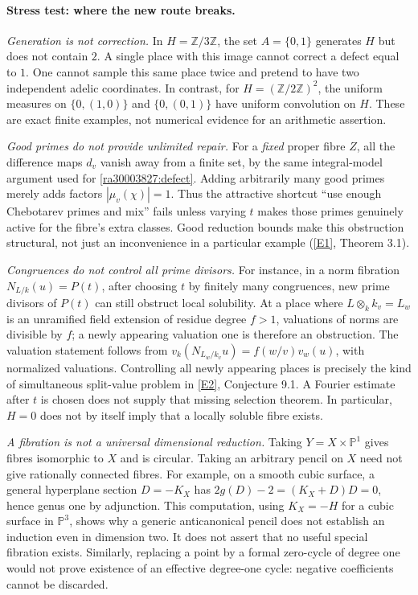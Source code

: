 \documentclass[11pt]{article}
\newcommand{\Z}{\mathbb{Z}}
\newcommand{\PP}{\mathbb P}
\newcommand{\eref}[2]{\hyperlink{extra:#1:#2}{[E#2]}}
\begin{document}
\paragraph{Stress test: where the new route breaks.}
\emph{Generation is not correction.}  In $H=\Z/3\Z$, the set $A=\{0,1\}$
generates $H$ but does not contain $2$.  A single place with this image cannot
correct a defect equal to $1$.  One cannot sample this same place twice and
pretend to have two independent adelic coordinates.  In contrast, for
$H=(\Z/2\Z)^2$, the uniform measures on $\{0,(1,0)\}$ and $\{0,(0,1)\}$
have uniform convolution on $H$.  These are exact finite examples, not
numerical evidence for an arithmetic assertion.

\emph{Good primes do not provide unlimited repair.}  For a \emph{fixed}
proper fibre $Z$, all the difference maps $d_v$ vanish away from a finite set,
by the same integral-model argument used for \eqref{ra30003827:defect}.  Adding
arbitrarily many good primes merely adds factors
$|\widehat\mu_v(\chi)|=1$.  Thus the attractive shortcut ``use enough
Chebotarev primes and mix'' fails unless varying $t$ makes those primes genuinely
active for the fibre's extra classes.  Good reduction bounds make this
obstruction structural, not just an inconvenience in a particular example
(\eref{30003827}{1}, Theorem 3.1).

\emph{Congruences do not control all prime divisors.}  For instance, in a norm
fibration $N_{L/k}(u)=P(t)$, after choosing $t$ by finitely many congruences,
new prime divisors of $P(t)$ can still obstruct local solubility.  At a place
where $L\otimes_k k_v=L_w$ is an unramified field extension of residue
degree $f>1$, valuations of norms are divisible by $f$; a newly appearing valuation one is therefore an
obstruction.  The valuation statement follows from
$v_k(N_{L_w/k_v}u)=f(w/v)v_w(u)$, with normalized valuations.  Controlling
all newly appearing places is precisely the kind of simultaneous split-value
problem in \eref{30003827}{2}, Conjecture 9.1.  A Fourier estimate after $t$ is
chosen does not supply that missing selection theorem.  In particular, $H=0$
does not by itself imply that a locally soluble fibre exists.

\emph{A fibration is not a universal dimensional reduction.}  Taking
$Y=X\times\PP^1$ gives fibres isomorphic to $X$ and is circular.  Taking an
arbitrary pencil on $X$ need not give rationally connected fibres.  For example,
on a smooth cubic surface, a general hyperplane section $D=-K_X$ has
$2g(D)-2=(K_X+D)D=0$, hence genus one by adjunction.  This computation, using $K_X=-H$ for a cubic surface in $\PP^3$, shows
why a generic anticanonical pencil does not establish an induction even in
dimension two.  It does not assert that no useful special fibration exists.
Similarly, replacing a point by a formal zero-cycle of degree one would not
prove existence of an effective degree-one cycle: negative coefficients cannot
be discarded.
\end{document}
